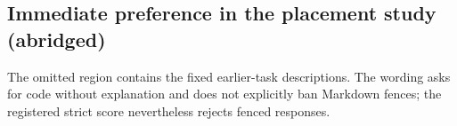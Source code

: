 \documentclass[10pt,a4paper,twocolumn]{article}
\begin{document}
\subsection{Immediate preference in the placement study (abridged)}

The omitted region contains the fixed earlier-task descriptions. The wording
asks for code without explanation and does not explicitly ban Markdown fences;
the registered strict score nevertheless rejects fenced responses.
\end{document}

